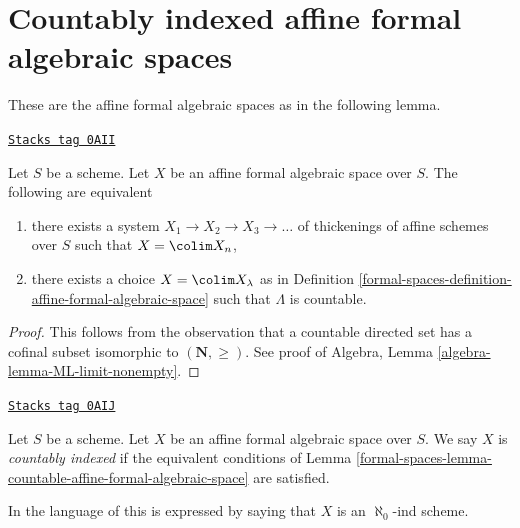 \section{Countably indexed affine formal algebraic spaces}
\label{formal-spaces-section-countably-indexed}
These are the affine formal algebraic spaces as in the following lemma.

\begin{lemma}
\label{formal-spaces-lemma-countable-affine-formal-algebraic-space}
\href{https://stacks.math.columbia.edu/tag/0AII}{\texttt{Stacks tag 0AII}}

Let $S$ be a scheme. Let $X$ be an affine formal algebraic space over $S$.
The following are equivalent
\begin{enumerate}
\item there exists a system $X_1 \to X_2 \to X_3 \to \ldots$
of thickenings of affine schemes over $S$ such that $X = \colim X_n$,
\item there exists a choice $X = \colim X_\lambda$ as in
Definition \ref{formal-spaces-definition-affine-formal-algebraic-space}
such that $\Lambda$ is countable.
\end{enumerate}
\end{lemma}

\begin{proof}
This follows from the observation that a countable directed set
has a cofinal subset isomorphic to $(\mathbf{N}, \geq)$.
See proof of Algebra, Lemma \ref{algebra-lemma-ML-limit-nonempty}.
\end{proof}

\begin{definition}[Countable]
\label{formal-spaces-definition-countable}
\href{https://stacks.math.columbia.edu/tag/0AIJ}{\texttt{Stacks tag 0AIJ}}

Let $S$ be a scheme. Let $X$ be an affine formal algebraic space over $S$.
We say $X$ is {\it countably indexed} if the equivalent conditions of
Lemma \ref{formal-spaces-lemma-countable-affine-formal-algebraic-space} are satisfied.
\end{definition}

In the language of \cite{BVGD} this is expressed by saying that
$X$ is an $\aleph_0$-ind scheme.

